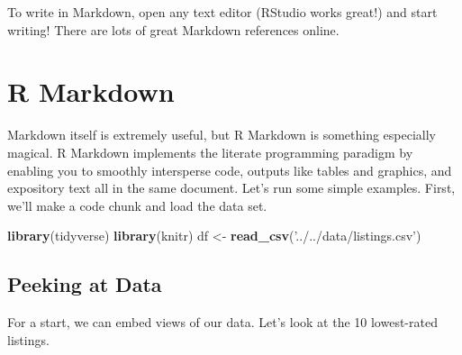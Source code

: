 \documentclass[]{article}
\newenvironment{Shaded}{\begin{snugshade}}{\end{snugshade}}
\newcommand{\DecValTok}[1]{\textcolor[rgb]{0.00,0.00,0.81}{#1}}
\newcommand{\KeywordTok}[1]{\textcolor[rgb]{0.13,0.29,0.53}{\textbf{#1}}}
\newcommand{\NormalTok}[1]{#1}
\newcommand{\OperatorTok}[1]{\textcolor[rgb]{0.81,0.36,0.00}{\textbf{#1}}}
\newcommand{\StringTok}[1]{\textcolor[rgb]{0.31,0.60,0.02}{#1}}
\begin{document}
To write in Markdown, open any text editor (RStudio works great!) and
start writing! There are lots of great Markdown references online.

\hypertarget{r-markdown}{%
\section{R Markdown}\label{r-markdown}}

Markdown itself is extremely useful, but R Markdown is something
especially magical. R Markdown implements the literate programming
paradigm by enabling you to smoothly intersperse code, outputs like
tables and graphics, and expository text all in the same document. Let's
run some simple examples. First, we'll make a code chunk and load the
data set.

\begin{Shaded}
\begin{Highlighting}[]
\KeywordTok{library}\NormalTok{(tidyverse)}
\KeywordTok{library}\NormalTok{(knitr)}
\NormalTok{df <-}\StringTok{ }\KeywordTok{read_csv}\NormalTok{(}\StringTok{'../../data/listings.csv'}\NormalTok{)}
\end{Highlighting}
\end{Shaded}

\hypertarget{peeking-at-data}{%
\subsection{Peeking at Data}\label{peeking-at-data}}

For a start, we can embed views of our data. Let's look at the 10
lowest-rated listings.

\begin{Shaded}
\end{Shaded}
\end{document}
